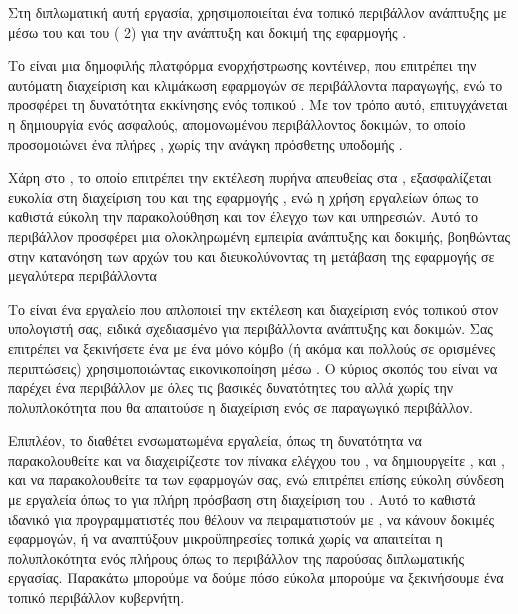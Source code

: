 Στη διπλωματική αυτή εργασία, χρησιμοποιείται ένα τοπικό περιβάλλον 
ανάπτυξης με  μέσω του  και του 
( 2) για την ανάπτυξη και δοκιμή 
της εφαρμογής . 

Το  είναι μια δημοφιλής 
πλατφόρμα ενορχήστρωσης κοντέινερ, που επιτρέπει την αυτόματη 
διαχείριση και κλιμάκωση εφαρμογών σε περιβάλλοντα παραγωγής, 
ενώ το  προσφέρει τη δυνατότητα εκκίνησης ενός 
τοπικού . 
Με τον τρόπο αυτό, επιτυγχάνεται η δημιουργία ενός ασφαλούς, 
απομονωμένου περιβάλλοντος δοκιμών, το οποίο προσομοιώνει ένα 
πλήρες , χωρίς την ανάγκη πρόσθετης υποδομής .

Χάρη στο , το οποίο επιτρέπει την εκτέλεση  
πυρήνα απευθείας στα , 
εξασφαλίζεται ευκολία στη διαχείριση του  
και της εφαρμογής , 
ενώ η χρήση εργαλείων όπως το  
καθιστά εύκολη την παρακολούθηση και τον έλεγχο των  
και υπηρεσιών. Αυτό το περιβάλλον προσφέρει μια ολοκληρωμένη 
εμπειρία ανάπτυξης και δοκιμής, βοηθώντας στην κατανόηση των 
αρχών του  και διευκολύνοντας τη μετάβαση της 
εφαρμογής σε μεγαλύτερα  περιβάλλοντα

Το  είναι ένα εργαλείο που απλοποιεί την εκτέλεση και 
διαχείριση ενός τοπικού  στον υπολογιστή σας,
ειδικά σχεδιασμένο για περιβάλλοντα ανάπτυξης και δοκιμών. 
Σας επιτρέπει να ξεκινήσετε ένα  
με ένα μόνο κόμβο (ή ακόμα και πολλούς σε ορισμένες περιπτώσεις) 
χρησιμοποιώντας εικονικοποίηση μέσω . 
Ο κύριος σκοπός του  είναι να παρέχει ένα περιβάλλον  
με όλες τις βασικές δυνατότητες του  
αλλά χωρίς την πολυπλοκότητα που θα απαιτούσε η διαχείριση ενός 
σε παραγωγικό περιβάλλον.

Επιπλέον, το  
διαθέτει ενσωματωμένα εργαλεία, όπως τη δυνατότητα να παρακολουθείτε
και να διαχειρίζεστε τον πίνακα ελέγχου του , 
να δημιουργείτε , και , και 
να παρακολουθείτε τα  των εφαρμογών σας, ενώ επιτρέπει 
επίσης εύκολη σύνδεση με εργαλεία όπως το  
για πλήρη πρόσβαση στη διαχείριση του . 
Αυτό το καθιστά ιδανικό για προγραμματιστές που θέλουν να 
πειραματιστούν με , 
να κάνουν δοκιμές εφαρμογών, ή να αναπτύξουν μικροϋπηρεσίες 
τοπικά χωρίς να απαιτείται η πολυπλοκότητα ενός πλήρους 
όπως το περιβάλλον της παρούσας διπλωματικής εργασίας. Παρακάτω μπορούμε να δούμε 
πόσο εύκολα μπορούμε να ξεκινήσουμε ένα τοπικό περιβάλλον κυβερνήτη.


